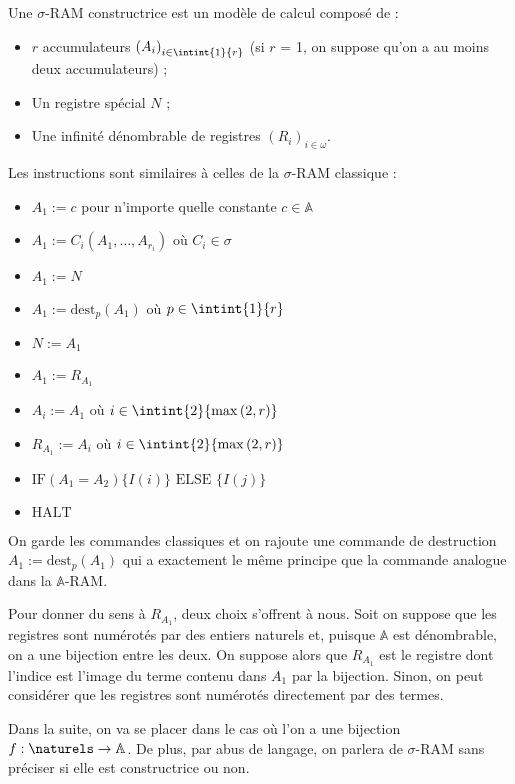 \documentclass{article}
\newcommand{\sRAMifc}[2]{\text{IF} (A_1=A_2) \{I( #1 )\} \text{ ELSE } \{I( #2 )\}}
\newcommand{\bbA}{\mathbb{A}}
\begin{document}
			\begin{definition}
				Une $\sigma$-RAM constructrice est un modèle de calcul composé de :
				
				\begin{itemize}[itemsep=-1mm]
					\item	$r$ accumulateurs $\left(A_i\right)_{i\in \intint{1}{r}}$ (si $r$ = 1, on suppose qu'on a au moins deux accumulateurs) ;
					\item 	Un registre spécial $N$ ;
					\item 	Une infinité dénombrable de registres $\left( R_i\right)_{i \in \omega}$.
				\end{itemize}
			
				
				Les instructions sont similaires à celles de la $\sigma$-RAM classique :
				
				\begin{itemize}[itemsep=-1mm]
					\item 	$A_1 := c$ pour n'importe quelle constante $c \in \bbA$
					\item 	$A_1 := C_i(A_1, \dots, A_{r_i})$ où $C_i \in \sigma$
					\item 	$A_1 := N$
					\item 	$A_1 := \text{dest}_p(A_1)$ où $p \in \intint{1}{r}$
					\item 	$N := A_1$
					\item 	$A_1 := R_{A_1}$
					\item 	$A_i := A_1$ où $i \in \intint{2}{\max\left( 2, r \right)}$
					\item 	$R_{A_1} := A_i$ où $i \in \intint{2}{\max\left( 2, r \right)}$
					\item 	$\sRAMifc{i}{j}$
					\item 	$\text{HALT}$
				\end{itemize}
				
				On garde les commandes classiques et on rajoute une commande de destruction $A_1 := \text{dest}_p(A_1)$ qui a exactement le même principe que la commande analogue dans la $\bbA$-RAM.
				
				Pour donner du sens à $R_{A_1}$, deux choix s'offrent à nous. Soit on suppose que les registres sont numérotés par des entiers naturels et, puisque $\bbA$ est dénombrable, on a une bijection entre les deux. On suppose alors que $R_{A_1}$ est le registre dont l'indice est l'image du terme contenu dans $A_1$ par la bijection. Sinon, on peut considérer que les registres sont numérotés directement par des termes.
				
				Dans la suite, on va se placer dans le cas où l'on a une bijection $f : \naturels \to \bbA$.
				De plus, par abus de langage, on parlera de $\sigma$-RAM sans préciser si elle est constructrice ou non.
			\end{definition}
\end{document}
